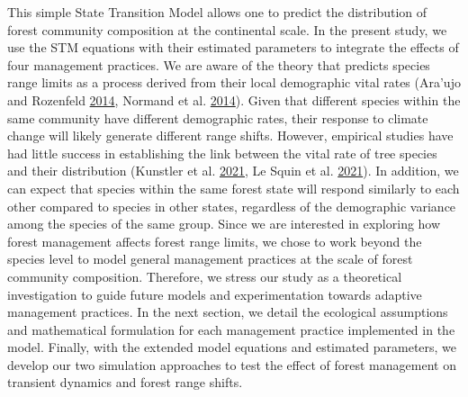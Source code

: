 \documentclass[12pt]{article}
\begin{document}
This simple State Transition Model allows one to predict the
distribution of forest community composition at the continental scale.
In the present study, we use the STM equations with their estimated
parameters to integrate the effects of four management practices. We are
aware of the theory that predicts species range limits as a process
derived from their local demographic vital rates (Ara\a'ujo and
Rozenfeld \protect\hyperlink{ref-Araujo2014a}{2014}, Normand et al.
\protect\hyperlink{ref-Normand2014}{2014}). Given that different species
within the same community have different demographic rates, their
response to climate change will likely generate different range shifts.
However, empirical studies have had little success in establishing the
link between the vital rate of tree species and their distribution
(Kunstler et al. \protect\hyperlink{ref-Kunstler2021}{2021}, Le Squin et
al. \protect\hyperlink{ref-LeSquin2021}{2021}). In addition, we can
expect that species within the same forest state will respond similarly
to each other compared to species in other states, regardless of the
demographic variance among the species of the same group. Since we are
interested in exploring how forest management affects forest range
limits, we chose to work beyond the species level to model general
management practices at the scale of forest community composition.
Therefore, we stress our study as a theoretical investigation to guide
future models and experimentation towards adaptive management practices.
In the next section, we detail the ecological assumptions and
mathematical formulation for each management practice implemented in the
model. Finally, with the extended model equations and estimated
parameters, we develop our two simulation approaches to test the effect
of forest management on transient dynamics and forest range shifts.
\end{document}
